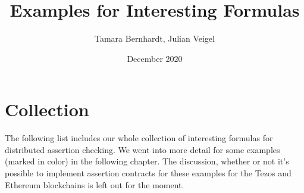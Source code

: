 \documentclass{article}
\title{Examples for Interesting Formulas}
\author{Tamara Bernhardt, Julian Veigel}
\date{December 2020}
\begin{document}
\maketitle

\section{Collection}\label{sec:collection}
The following list includes our whole collection of interesting formulas for distributed assertion checking. We went into more detail for some examples (marked in color) in the following chapter. The discussion, whether or not it's possible to implement assertion contracts for these examples for the Tezos and Ethereum blockchains is left out for the moment. 
\end{document}
